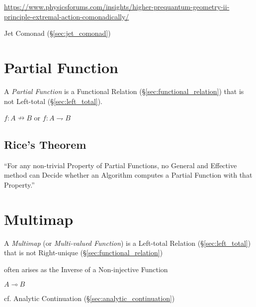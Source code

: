\url{https://www.physicsforums.com/insights/higher-prequantum-geometry-ii-principle-extremal-action-comonadically/}

\fist Jet Comonad (\S\ref{sec:jet_comonad})





\section{Partial Function}\label{sec:partial_function}

A \emph{Partial Function} is a Functional Relation
(\S\ref{sec:functional_relation}) that is not Left-total
(\S\ref{sec:left_total}).

$f : A \nrightarrow B$ or $f : A \rightharpoondown B$




\subsection{Rice's Theorem}\label{sec:rices_theorem}

``For any non-trivial Property of Partial Functions, no General and
Effective method can Decide whether an Algorithm computes a Partial
Function with that Property.''



\section{Multimap}\label{sec:multimap}

A \emph{Multimap} (or \emph{Multi-valued Function}) is a Left-total
Relation (\S\ref{sec:left_total}) that is not Right-unique
(\S\ref{sec:functional_relation})

often arises as the Inverse of a Non-injective Function

$A \multimap B$

cf. Analytic Continuation (\S\ref{sec:analytic_continuation})



